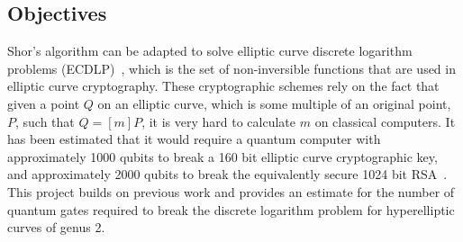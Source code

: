 \subsection{Objectives}
Shor's algorithm can be adapted to solve elliptic curve discrete logarithm problems (ECDLP)~\cite{proos2003shor}, which is the set of non-inversible functions that are used in elliptic curve cryptography. These cryptographic schemes rely on the fact that given a point $Q$ on an elliptic curve, which is some multiple of an original point, $P$, such that $Q = [m]P$, it is very hard to calculate $m$ on classical computers. 
It has been estimated that it would require a quantum computer with approximately 1000 qubits to break a 160 bit elliptic curve cryptographic key, and approximately 2000 qubits to break the equivalently secure 1024 bit RSA~\cite{proos2003shor}.
This project builds on previous work and provides an estimate for the number of quantum gates required to break the discrete logarithm problem for hyperelliptic curves of genus 2.